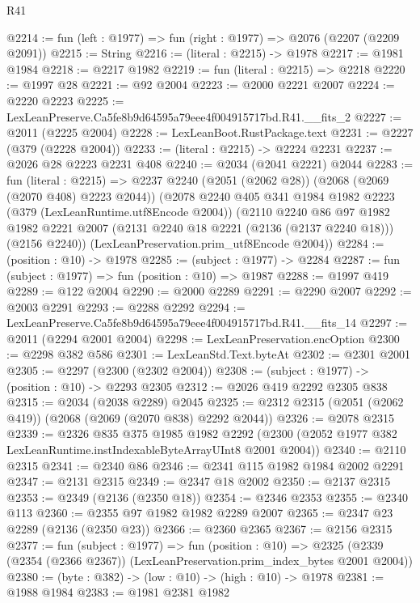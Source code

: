 \begin{lexlean}{R41}
\begin{coremodule}
@2214 := fun (left : @1977) => fun (right : @1977) => @2076 (@2207 (@2209 @2091))
@2215 := String
@2216 := (literal : @2215) -> @1978
@2217 := @1981 @1984
@2218 := @2217 @1982
@2219 := fun (literal : @2215) => @2218
@2220 := @1997 @28
@2221 := @92 @2004
@2223 := @2000 @2221 @2007
@2224 := @2220 @2223
@2225 := LexLeanPreserve.Ca5fe8b9d64595a79eee4f004915717bd.R41.__fits_2
@2227 := @2011 (@2225 @2004)
@2228 := LexLeanBoot.RustPackage.text
@2231 := @2227 (@379 (@2228 @2004))
@2233 := (literal : @2215) -> @2224 @2231
@2237 := @2026 @28 @2223 @2231 @408
@2240 := @2034 (@2041 @2221) @2044
@2283 := fun (literal : @2215) =>
  @2237
    @2240
    (@2051 (@2062 @28))
    (@2068 (@2069 (@2070 @408) @2223 @2044))
    (@2078
      @2240
      @405
      @341
      @1984
      @1982
      @2223
      (@379 (LexLeanRuntime.utf8Encode @2004))
      (@2110
        @2240
        @86
        @97
        @1982
        @1982
        @2221
        @2007
        (@2131 @2240 @18 @2221 (@2136 (@2137 @2240 @18)))
        (@2156 @2240))
      (LexLeanPreservation.prim_utf8Encode @2004))
@2284 := (position : @10) -> @1978
@2285 := (subject : @1977) -> @2284
@2287 := fun (subject : @1977) => fun (position : @10) => @1987
@2288 := @1997 @419
@2289 := @122 @2004
@2290 := @2000 @2289
@2291 := @2290 @2007
@2292 := @2003 @2291
@2293 := @2288 @2292
@2294 := LexLeanPreserve.Ca5fe8b9d64595a79eee4f004915717bd.R41.__fits_14
@2297 := @2011 (@2294 @2001 @2004)
@2298 := LexLeanPreservation.encOption
@2300 := @2298 @382 @586
@2301 := LexLeanStd.Text.byteAt
@2302 := @2301 @2001
@2305 := @2297 (@2300 (@2302 @2004))
@2308 := (subject : @1977) -> (position : @10) -> @2293 @2305
@2312 := @2026 @419 @2292 @2305 @838
@2315 := @2034 (@2038 @2289) @2045
@2325 := @2312 @2315 (@2051 (@2062 @419)) (@2068 (@2069 (@2070 @838) @2292 @2044))
@2326 := @2078 @2315
@2339 := @2326
    @835
    @375
    @1985
    @1982
    @2292
    (@2300 (@2052 @1977 @382 LexLeanRuntime.instIndexableByteArrayUInt8 @2001 @2004))
@2340 := @2110 @2315
@2341 := @2340 @86
@2346 := @2341 @115 @1982 @1984 @2002 @2291
@2347 := @2131 @2315
@2349 := @2347 @18 @2002
@2350 := @2137 @2315
@2353 := @2349 (@2136 (@2350 @18))
@2354 := @2346 @2353
@2355 := @2340 @113
@2360 := @2355 @97 @1982 @1982 @2289 @2007
@2365 := @2347 @23 @2289 (@2136 (@2350 @23))
@2366 := @2360 @2365
@2367 := @2156 @2315
@2377 := fun (subject : @1977) =>
  fun (position : @10) =>
  @2325 (@2339 (@2354 (@2366 @2367)) (LexLeanPreservation.prim_index_bytes @2001 @2004))
@2380 := (byte : @382) -> (low : @10) -> (high : @10) -> @1978
@2381 := @1988 @1984
@2383 := @1981 @2381 @1982

\end{coremodule}
\end{lexlean}
